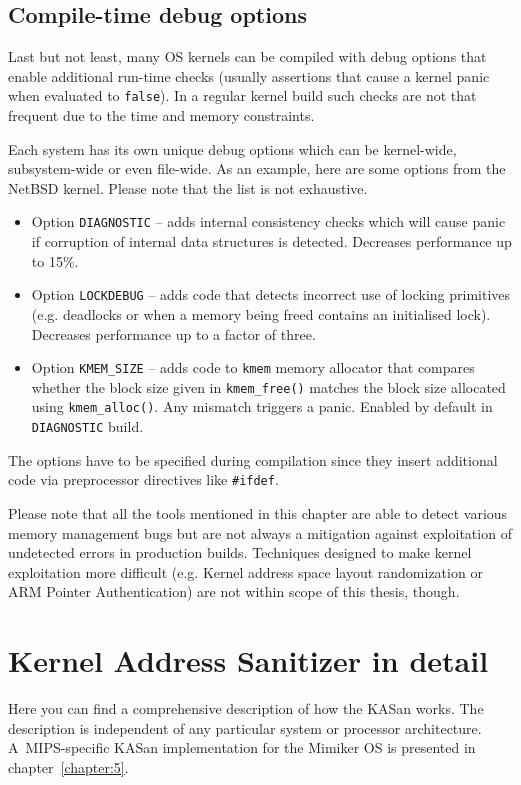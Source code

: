 \documentclass[shortabstract, manyadvisors, english, mgr]{iithesis}
\theoremstyle{definition} \newtheorem*{definition}{Definicja}
\theoremstyle{definition} \newtheorem*{example}{Przykład}
\theoremstyle{definition} \newtheorem*{remark}{Uwaga}
\begin{document}
\section{Compile-time debug options}
Last but not least, many OS kernels can be compiled with debug options that enable additional run-time checks (usually assertions that cause a kernel panic when evaluated to \texttt{false}). In a regular kernel build such checks are not that frequent due to the time and memory constraints.

Each system has its own unique debug options which can be kernel-wide, subsystem-wide or even file-wide. As an example, here are some options from the NetBSD kernel. Please note that the list is not exhaustive.
\begin{itemize}
    \item Option \texttt{DIAGNOSTIC} \cite{bib:netbsd-options-4} -- adds internal consistency checks which will cause panic if corruption of internal data structures is detected. Decreases performance up to 15\%.
    \item Option \texttt{LOCKDEBUG} \cite{bib:netbsd-options-4} -- adds code that detects incorrect use of locking primitives (e.g. deadlocks or when a memory being freed contains an initialised lock). Decreases performance up to a factor of three.
    \item Option \texttt{KMEM\_SIZE} \cite{bib:netbsd-kmem-9} -- adds code to \texttt{kmem} memory allocator that compares whether the block size given in \texttt{kmem\_free()} matches the block size allocated using \texttt{kmem\_alloc()}. Any mismatch triggers a panic. Enabled by default in \texttt{DIAGNOSTIC} build.
\end{itemize}

The options have to be specified during compilation since they insert additional code via preprocessor directives like \texttt{\#ifdef}.

Please note that all the tools mentioned in this chapter are able to detect various memory management bugs but are not always a mitigation against exploitation of undetected errors in production builds.
Techniques designed to make kernel exploitation more difficult (e.g. Kernel address space layout randomization or ARM Pointer Authentication) are not within scope of this thesis, though.

\chapter{Kernel Address Sanitizer in detail}
\label{chapter:4}
Here you can find a comprehensive description of how the KASan works. The description is independent of any particular system or processor architecture. A~MIPS-specific KASan implementation for the Mimiker OS is presented in chapter~\ref{chapter:5}.
\end{document}
